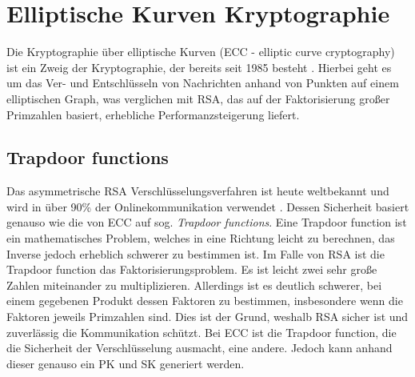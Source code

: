 \documentclass[
	fontsize=11pt,
	headings=small,
	parskip=half,           %
	bibliography=totoc,
	numbers=noenddot,       %
	open=any,               %
]{scrreprt}
\begin{document}
\section{Elliptische Kurven Kryptographie}
\label{sec:ecc}
Die Kryptographie über elliptische Kurven (ECC - elliptic curve cryptography) ist ein Zweig der Kryptographie, der bereits seit 1985 besteht \cite{ecc-miller1985use}. Hierbei geht es um das Ver- und Entschlüsseln von Nachrichten anhand von Punkten auf einem elliptischen Graph, was verglichen mit RSA, das auf der Faktorisierung großer Primzahlen basiert, erhebliche Performanzsteigerung liefert.

\subsection{Trapdoor functions}
Das asymmetrische RSA Verschlüsselungsverfahren ist heute weltbekannt und wird in über 90\% der Onlinekommunikation verwendet \cite{ecc-rsa_amount}. Dessen Sicherheit basiert genauso wie die von ECC auf sog.  \textit{Trapdoor functions}. Eine Trapdoor function ist ein mathematisches Problem, welches in eine Richtung leicht zu berechnen, das Inverse jedoch erheblich schwerer zu bestimmen ist. Im Falle von RSA ist die Trapdoor function das Faktorisierungsproblem. Es ist leicht zwei sehr große Zahlen miteinander zu multiplizieren. Allerdings ist es deutlich schwerer, bei einem gegebenen Produkt dessen Faktoren zu bestimmen, insbesondere wenn die Faktoren jeweils Primzahlen sind. Dies ist der Grund, weshalb RSA sicher ist und zuverlässig die Kommunikation schützt. Bei ECC ist die Trapdoor function, die die Sicherheit der Verschlüsselung ausmacht, eine andere. Jedoch kann anhand dieser genauso ein PK und SK generiert werden.
\end{document}
